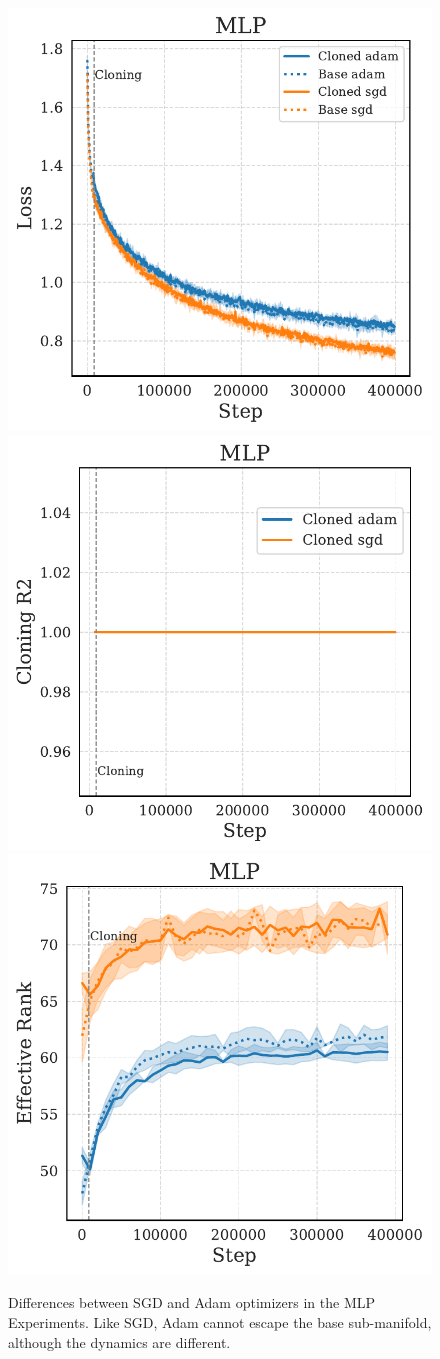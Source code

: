 \documentclass{article}
\numberwithin{figure}{section}
\begin{document}
\begin{figure}
    \centering
    \includegraphics[width=0.3\linewidth]{paper/images/mlp_optimizer_cloning_losses_plot.pdf}
    \includegraphics[width=0.3\linewidth]{paper/images/mlp_optimizer_cloning_r2_plot.pdf}
    \includegraphics[width=0.3\linewidth]{paper/images/mlp_optimizer_cloning_rank_plot.pdf}
    \caption{Differences between SGD and Adam optimizers in the MLP Experiments. Like SGD, Adam cannot escape the base sub-manifold, although the dynamics are different.}
    \label{fig:cloning-sgd-adam}
\end{figure}
\end{document}
